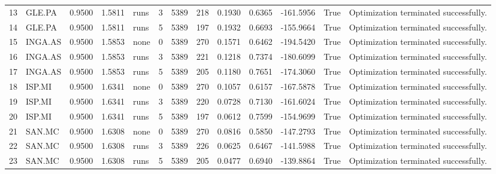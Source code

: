 \begin{table}
\begin{tabular}{llrrlrrrrrrrl}
13 & GLE.PA & 0.9500 & 1.5811 & runs & 3 & 5389 & 218 & 0.1930 & 0.6365 & -161.5956 & True & Optimization terminated successfully. \\
14 & GLE.PA & 0.9500 & 1.5811 & runs & 5 & 5389 & 197 & 0.1932 & 0.6693 & -155.9664 & True & Optimization terminated successfully. \\
15 & INGA.AS & 0.9500 & 1.5853 & none & 0 & 5389 & 270 & 0.1571 & 0.6462 & -194.5420 & True & Optimization terminated successfully. \\
16 & INGA.AS & 0.9500 & 1.5853 & runs & 3 & 5389 & 221 & 0.1218 & 0.7374 & -180.6099 & True & Optimization terminated successfully. \\
17 & INGA.AS & 0.9500 & 1.5853 & runs & 5 & 5389 & 205 & 0.1180 & 0.7651 & -174.3060 & True & Optimization terminated successfully. \\
18 & ISP.MI & 0.9500 & 1.6341 & none & 0 & 5389 & 270 & 0.1057 & 0.6157 & -167.5878 & True & Optimization terminated successfully. \\
19 & ISP.MI & 0.9500 & 1.6341 & runs & 3 & 5389 & 220 & 0.0728 & 0.7130 & -161.6024 & True & Optimization terminated successfully. \\
20 & ISP.MI & 0.9500 & 1.6341 & runs & 5 & 5389 & 197 & 0.0612 & 0.7599 & -154.9699 & True & Optimization terminated successfully. \\
21 & SAN.MC & 0.9500 & 1.6308 & none & 0 & 5389 & 270 & 0.0816 & 0.5850 & -147.2793 & True & Optimization terminated successfully. \\
22 & SAN.MC & 0.9500 & 1.6308 & runs & 3 & 5389 & 226 & 0.0625 & 0.6467 & -141.5988 & True & Optimization terminated successfully. \\
23 & SAN.MC & 0.9500 & 1.6308 & runs & 5 & 5389 & 205 & 0.0477 & 0.6940 & -139.8864 & True & Optimization terminated successfully. \\
\bottomrule
\end{tabular}
\end{table}
